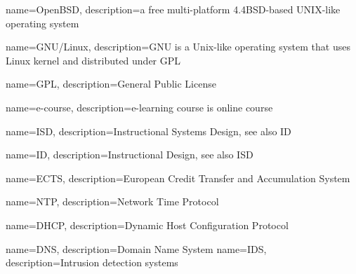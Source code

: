 {
  name=OpenBSD,
  description={a free multi-platform 4.4BSD-based UNIX-like operating system}
}

{
  name=GNU/Linux,
  description={GNU is a Unix-like operating system that uses Linux kernel and distributed under \gls{GPL}}
}


{
  name=GPL,
  description={General Public License}
}

{
  name=e-course,
  description={e-learning course is online course}
}

{
  name=ISD,
  description={Instructional Systems Design, see also \gls{ID}}
}

{
  name=ID,
  description={Instructional Design, see also \gls{ISD}}
}

{
  name=ECTS,
  description={European Credit Transfer and Accumulation System}
}

{
  name=NTP,
  description={Network Time Protocol}
}

{
  name=DHCP,
  description={Dynamic Host Configuration Protocol}
}

{
  name=DNS,
  description={Domain Name System}
}
{
  name=IDS,
  description={Intrusion detection systems}
}

